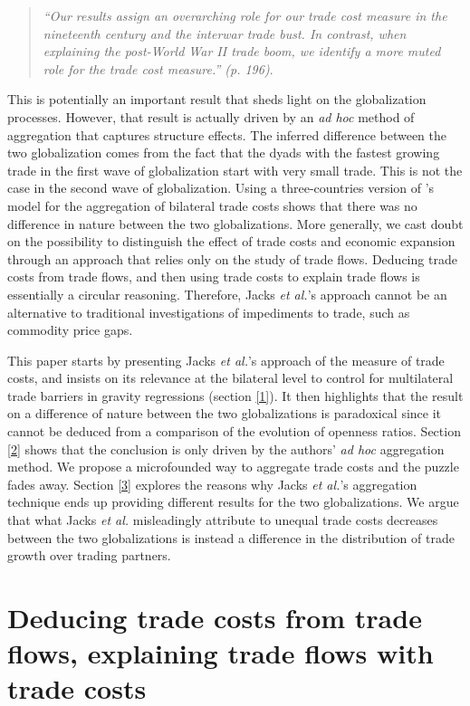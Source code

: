 \documentclass{article}
\begin{document}
\begin{quote}
\emph{``Our results assign an overarching role for our trade
cost measure in the nineteenth century and the interwar trade
bust. In contrast, when explaining the post-World War II trade
boom, we identify a more muted role for the trade cost
measure.'' (p. 196)}.
\end{quote}

This is potentially an important result that sheds light on the globalization processes. However, that result is actually driven by an \textit{ad hoc}
method of aggregation that captures structure effects. The inferred difference between the two globalization comes from the fact that the dyads with the 
fastest growing trade in the first wave of globalization start with very small 
trade. This is not the case in the second wave of globalization.
Using a three-countries version of \cite{AW2003}'s model for
the aggregation of bilateral trade costs shows that there was no 
difference in nature between the two globalizations. More generally, we
cast doubt on the possibility to distinguish the effect of trade costs and economic expansion through an approach that relies only on the study of trade
flows. Deducing trade costs from trade flows, and then using
trade costs to explain trade flows is essentially a circular
reasoning. Therefore, Jacks \textit{et al.}'s approach cannot be an
alternative to traditional investigations of impediments to
trade, such as commodity price gaps.

This paper starts by presenting Jacks \textit{et al.}'s approach of the
measure of trade costs, and insists on its relevance at the
bilateral level to control for multilateral trade barriers in
gravity regressions (section \ref{1}). It then highlights that the
result on a difference of nature between the two globalizations
is paradoxical since it cannot be deduced from a comparison of the
evolution of openness ratios. Section \ref{2} shows that the
conclusion is only driven by the authors' \textit{ad hoc} aggregation
method. We propose a microfounded way to aggregate trade costs
and the puzzle fades away. Section \ref{3} explores the reasons
why Jacks \textit{et al.}'s aggregation technique ends up providing
different results for the two globalizations. We argue that
what Jacks \textit{et al.} misleadingly attribute to unequal trade costs
decreases between the two globalizations is instead a
difference in the distribution of trade growth over trading
partners.

\section{\label{1} Deducing trade costs from trade flows, explaining trade flows with trade costs}
\end{document}
